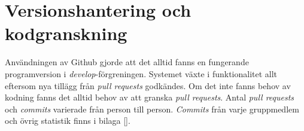 \section{Versionshantering och kodgranskning}

Användningen av Github gjorde att det alltid fanns en fungerande programversion
i \emph{develop}-förgreningen. Systemet växte i funktionalitet allt eftersom
nya tillägg från \emph{pull requests} godkändes. Om det inte fanns behov av
kodning fanns det alltid behov av att granska \emph{pull requests}. Antal
\emph{pull requests} och \emph{commits} varierade från person till person.
\emph{Commits} från varje gruppmedlem och övrig statistik finns i bilaga [].
